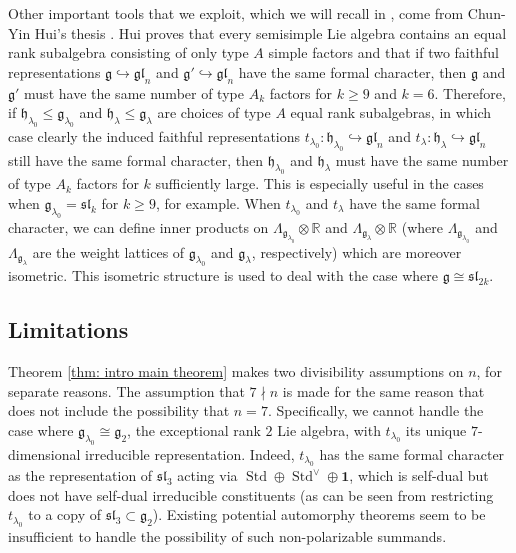 \documentclass{amsart}
\theoremstyle{definition}
\numberwithin{equation}{section} %
\newcommand{\sllie}{\mathfrak{sl}}
\newcommand{\Std}{\operatorname{Std}}
\newcommand{\bb}[1]{\mathbb{#1}}
\newcommand{\mf}[1]{\mathfrak{#1}}
\begin{document}
Other important tools that we exploit, which we will recall in , come from Chun-Yin Hui's thesis \cite{hui2013monodromy}. Hui proves that every semisimple Lie algebra contains an equal rank subalgebra consisting of only type \( A \) simple factors and that if two faithful representations \( \mf{g}\hookrightarrow\mf{gl}_n \) and \( \mf{g}'\hookrightarrow\mf{gl}_n \) have the same formal character, then \( \mf{g} \) and \( \mf{g}' \) must have the same number of type \( A_k \) factors for \( k\geq 9 \) and \( k=6 \). Therefore, if \( \mf{h}_{\lambda_0}\leq\mf{g}_{\lambda_0} \) and \( \mf{h}_\lambda\leq\mf{g}_\lambda \) are choices of type \( A \) equal rank subalgebras, in which case clearly the induced faithful representations \( t_{\lambda_0}:\mf{h}_{\lambda_0}\hookrightarrow \mf{gl}_n \) and \( t_{\lambda}:\mf{h}_{\lambda}\hookrightarrow \mf{gl}_n \) still have the same formal character, then \( \mf{h}_{\lambda_0} \) and \( \mf{h}_\lambda \) must have the same number of type \( A_k \) factors for \( k \) sufficiently large. This is especially useful in the cases when \( \mf{g}_{\lambda_0}=\mf{sl}_k \) for \( k\geq 9 \), for example. When \( t_{\lambda_0} \) and \( t_\lambda \) have the same formal character, we can define inner products on \( \Lambda_{\mf{g}_{\lambda_0}}\otimes\bb{R} \) and \( \Lambda_{\mf{g}_{\lambda}}\otimes\bb{R} \) (where \( \Lambda_{\mf{g}_{\lambda_0}} \) and \( \Lambda_{\mf{g}_{\lambda}} \) are the weight lattices of \( \mf{g}_{\lambda_0} \) and \( \mf{g}_{\lambda} \), respectively) which are moreover isometric. This isometric structure is used to deal with the case where $\mf{g} \cong \sllie_{2k}$.

\subsection{Limitations}

Theorem \ref{thm: intro main theorem} makes two divisibility assumptions on $n$, for separate reasons. 
The assumption that \( 7\nmid n \) is made for the same reason that \cite{Xia19} does not include the possibility that $n=7$.
Specifically, we cannot handle the case where \( \mf{g}_{\lambda_0}\cong \mf{g}_2 \), the exceptional rank \( 2 \) Lie algebra, with \( t_{\lambda_0} \) its unique \( 7 \)-dimensional irreducible representation.
Indeed, \( t_{\lambda_0} \) has the same formal character as the representation of \( \mf{sl}_3 \) acting via \( \Std\oplus\Std^{\vee}\oplus\mathbf{1} \), which is self-dual but does not have self-dual irreducible constituents (as can be seen from restricting $t_{\lambda_0}$ to a copy of $\sllie_3 \subset \mf{g}_2$).
Existing potential automorphy theorems seem to be insufficient to handle the possibility of such non-polarizable summands.
\end{document}
